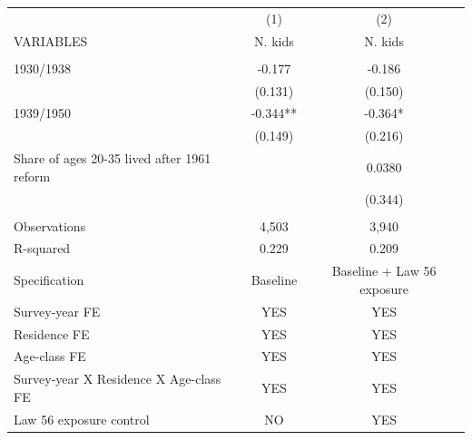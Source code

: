 \begin{tabular}{lcc} \hline
 & (1) & (2) \\
VARIABLES & N. kids & N. kids \\ \hline
 &  &  \\
1930/1938 & -0.177 & -0.186 \\
 & (0.131) & (0.150) \\
1939/1950 & -0.344** & -0.364* \\
 & (0.149) & (0.216) \\
Share of ages 20-35 lived after 1961 reform &  & 0.0380 \\
 &  & (0.344) \\
 &  &  \\
Observations & 4,503 & 3,940 \\
R-squared & 0.229 & 0.209 \\
Specification & Baseline & Baseline + Law 56 exposure \\
Survey-year FE & YES & YES \\
Residence FE & YES & YES \\
Age-class FE & YES & YES \\
Survey-year X Residence X Age-class FE & YES & YES \\
 Law 56 exposure control & NO & YES \\ \hline
\end{tabular}
